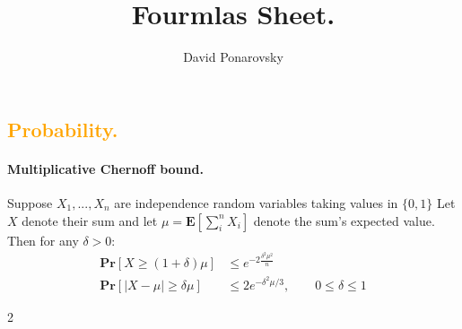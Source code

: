 \documentclass{article}
\newcommand{\prb}[1]{ \mathbf{Pr} \left[ {#1} \right]}
\newcommand{\expp}[1]{ \mathbf{E} \left[ {#1} \right]}
\begin{document}
\title{Fourmlas Sheet.} 
\author{David Ponarovsky}
\maketitle
\begin{multicols*}{2}
  \subsection*{ {\textcolor{orange}{Probability.}} } 
\paragraph{Multiplicative Chernoff bound.} Suppose $ X_1, ..., X_n$ are independence random variables taking values in $\{0, 1\}$ Let $X$ denote their sum and let $\mu = \expp{\sum_{i}^{n}{X_{i}}} $  denote the sum's expected value. Then for any $\delta > 0$: 
\begin{equation*}
    \begin{split}
      \prb{ X \ge \left( 1+\delta \right) \mu } & \le e^{-2\frac{\delta^2\mu^{2}}{n}} \\ 
      \prb{ |X - \mu| \ge \delta\mu } & \le 2e^{-\delta^2\mu/3}, \qquad 0 \le \delta \le 1
    \end{split}
  \end{equation*}
\end{multicols*}{2}
\end{document}
